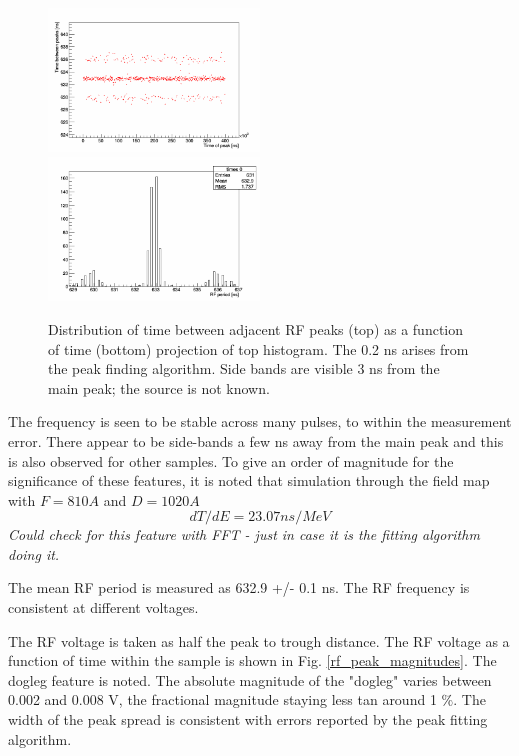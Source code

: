\documentclass{paper}
\begin{document}
\begin{figure}
		\includegraphics[width=0.5\textwidth]{images/v=7_18_rf_peak_deltas}
		\includegraphics[width=0.5\textwidth]{images/v=7_18_rf_period_distribution}
	\caption{Distribution of time between adjacent RF peaks (top) as a function of
          time (bottom) projection of top histogram. The 0.2 ns arises from the
          peak finding algorithm. Side bands are visible 3 ns from the main
          peak; the source is not known.}
	\label{fig:rf_peak_deltas}
\end{figure}

The frequency is seen to be stable across many pulses, to within the
measurement error. There appear to be side-bands a few ns away from the main
peak and this is also observed for other samples. To give an order of magnitude 
for the significance of these features, it is noted that simulation through the 
field map with $F = 810 A$ and $D = 1020 A$
\begin{equation}
dT/dE = 23.07 ns/MeV
\end{equation}
\emph{Could check for this feature with FFT - just in case it is the fitting
algorithm doing it.}

The mean RF period is measured as 632.9 +/- 0.1 ns. The RF frequency is 
consistent at different voltages.

The RF voltage is taken as half the peak to trough distance. The RF voltage as a
function of time within the sample is shown in Fig. \ref{rf_peak_magnitudes}. 
The dogleg feature is noted. The absolute magnitude of the "dogleg" varies 
between 0.002 and 0.008 V, the fractional magnitude staying less tan around 1 
$\%$. The width of the peak spread is consistent with errors reported by the
peak fitting algorithm.
\end{document}
